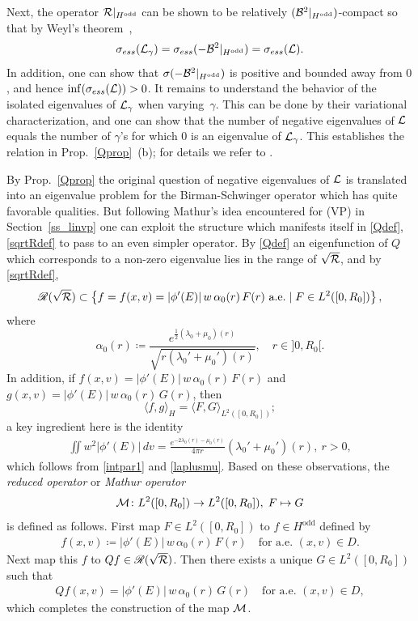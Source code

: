 \documentclass[11pt]{article}
\begin{document}
Next, the operator ${{\cal R}}|_{H^\mathrm{odd}}$ can be shown to be relatively
$({\cal B}^2|_{H^\mathrm{odd}})$-compact so that by Weyl's theorem~\cite[Thm.~14.6]{HiSi},
\[
\sigma_{ess}({\cal L}_\gamma)= \sigma_{ess}(-{\cal B}^2|_{H^\mathrm{odd}}) =\sigma_{ess}({\cal L}).
\]
In addition, one can show that $\sigma(-{\cal B}^2|_{H^\mathrm{odd}})$
is positive and bounded away from $0$, and hence $\inf(\sigma_{ess}({\cal L}))>0$.
It remains to understand the behavior of the isolated eigenvalues of ${\cal L}_\gamma$
when varying~$\gamma$.
This can be done by their variational characterization,
and one can show that the number of negative eigenvalues
of ${\cal L}$ equals the number of $\gamma$'s for which $0$ is an eigenvalue
of ${\cal L}_\gamma$.
This establishes the relation
in Prop.~\ref{Qprop}~(b); for details we refer to
\cite[Sections~6.1,~6.2]{GueStrRe}.

By Prop.~\ref{Qprop} the original question of negative eigenvalues of ${\cal L}$
is translated into an eigenvalue problem for the Birman-Schwinger operator which
has quite favorable qualities.
But following {\sc Mathur's} idea encountered for (VP) in Section~\ref{ss_linvp}
one can exploit the structure which manifests itself in
\eqref{Qdef}, \eqref{sqrtRdef}
to pass to an even simpler operator.
By  \eqref{Qdef} an eigenfunction of $Q$ which
corresponds to a non-zero eigenvalue lies in the range of $\sqrt{{{\cal R}}}$, and
by \eqref{sqrtRdef},
\[ 
  {\mathscr R}(\sqrt{{{\cal R}}})\subset\left\{f=f(x,v)=\vert\phi'(E)\vert\,w\, \alpha_0(r) \,F(r)
  \text{ a.e.}\mid F\in L^2([0,R_0])\right\},
\] 
where 
\[ 
  \alpha_0(r) \coloneqq
  \frac{e^{ \frac{1}{2}(\lambda_0+\mu_0)(r)}}{\sqrt{r(\lambda_0'+\mu_0')(r)}},
  \quad r\in ]0,R_0[.
\] 
In addition, if $f(x,v)=\vert\phi'(E)\vert\,w\,\alpha_0(r)\,F(r)$
and $g(x,v)=\vert\phi'(E)\vert\,w\,\alpha_0(r)\,G(r)$, then
\begin{equation}\label{mathur_sp}
  \langle f,g\rangle_H = \langle F,G \rangle_{L^2([0,R_0])};
\end{equation}
a key ingredient here is the identity
\begin{align*} %
  \iint w^2 |\phi'(E)| \, dv =
  \frac{e^{-2\lambda_0(r)-\mu_0(r)}}{4\pi r} (\lambda_0'+\mu_0') (r),\ r>0,
\end{align*}
which follows from \eqref{intpar1} and \eqref{laplusmu}. 
Based on these observations, 
the {\em reduced operator} or {\em Mathur operator}
\[
{\cal M}\colon L^2([0,R_0])\to L^2([0,R_0]),\;F\mapsto G
\]
is defined as follows.
First map $F\in L^2([0,R_0])$ to $f\in H^\mathrm{odd}$ defined by
\begin{align*} %
  f(x,v)\coloneqq\vert\phi'(E)\vert\,w\,\alpha_0(r)\,F(r)\quad
  \text{for a.e.\ } (x,v)\in D.
\end{align*}
Next map this $f$ to $Qf\in {\mathscr R} (\sqrt{{{\cal R}}})$. Then there
exists a unique $G\in L^2([0,R_0])$ such that
\begin{align*}
  Q f(x,v)=\vert\phi'(E)\vert\,w\,\alpha_0(r)\,G(r)\quad
  \text{for a.e.\ } (x,v)\in D,
\end{align*}
which completes the construction of the map ${\cal M}$.
\end{document}
